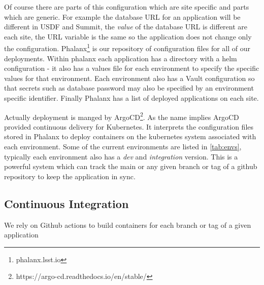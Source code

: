 Of course there are parts of this configuration which are site specific and parts which are generic.
For example the database URL for an application will be different in USDF and Summit, the \emph{value} of the database URL is different are each site, the URL variable is the same so the application does not change only the configuration.
Phalanx\footnote{phalanx.lsst.io} is our repository of configuration files for all of our deployments.
Within phalanx each application has a directory with a helm configuration - it also has a values file for each environment to specify the specific values for that environment.
Each environment also has a Vault configuration so that secrets such as database password may also be specified by an environment specific identifier.
Finally Phalanx has a list of deployed applications on each site.

Actually deployment is manged by ArgoCD\footnote{https://argo-cd.readthedocs.io/en/stable/}.
As the name implies ArgoCD provided continuous delivery for Kubernetes.
It interprets the configuration files stored in Phalanx to deploy containers on the kubernetes system associated with each environment.
Some of the current environments are listed in \autoref{tab:envs}, typically each environment also has a \emph{dev} and \emph{integration} version.
This is a powerful system which can track the main or any given branch or tag of a github repository to keep the application in sync.


\subsection{Continuous Integration}
We rely on Github actions to build containers for each branch or tag of a given application

